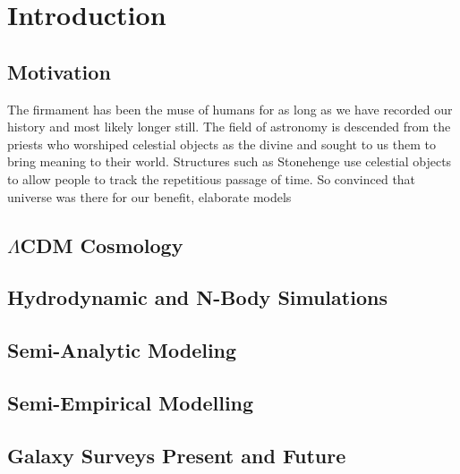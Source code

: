 
\chapter{Introduction} %
\label{Chapter:Intro}

\section{Motivation}
\label{sec:Motivation}
The firmament has been the muse of humans for as long as we have recorded our history and most likely longer still. The field of astronomy is descended from the priests who worshiped celestial objects as the divine and sought to us them to bring meaning to their world. Structures such as Stonehenge use celestial objects to allow people to track the repetitious passage of time. So convinced that universe was there for our benefit, elaborate models 



\section{$\Lambda$CDM Cosmology}
\label{sec:LCDM}





\section{Hydrodynamic and N-Body Simulations}
\label{sec:Hydro}




\section{Semi-Analytic Modeling}
\label{sec:SAM}



\section{Semi-Empirical Modelling}
\label{sec:SEM}



\section{Galaxy Surveys Present and Future}
\label{sec:Surveys}





